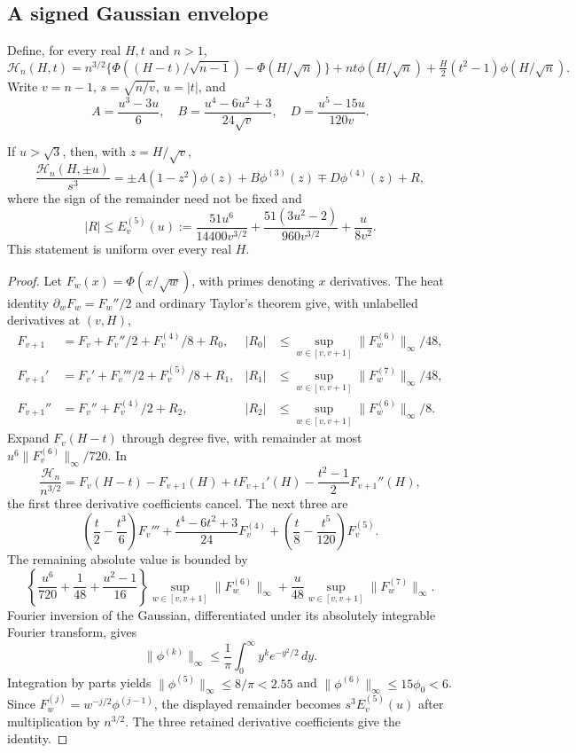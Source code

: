 \subsection{A signed Gaussian envelope}
Define, for every real $H,t$ and $n>1$,
\[
 \mathcal H_n(H,t)=n^{3/2}\{\Phi((H-t)/\sqrt{n-1})-
             \Phi(H/\sqrt n)\}
       +nt\phi(H/\sqrt n)+\tfrac H2(t^2-1)\phi(H/\sqrt n).
\]
Write $v=n-1$, $s=\sqrt{n/v}$, $u=|t|$, and
\[
 A=\frac{u^3-3u}{6},\quad B=\frac{u^4-6u^2+3}{24\sqrt v},
 \quad D=\frac{u^5-15u}{120v}.
\]
\begin{lemma}
If $u>\sqrt3$, then, with $z=H/\sqrt v$,
\[
 \frac{\mathcal H_n(H,\pm u)}{s^3}
 =\pm A(1-z^2)\phi(z)+B\phi^{(3)}(z)
                  \mp D\phi^{(4)}(z)+R,
\]
where the sign of the remainder need not be fixed and
\[
 |R|\le E^{(5)}_v(u):=
 \frac{51u^6}{14400v^{3/2}}
 +\frac{51(3u^2-2)}{960v^{3/2}}+\frac{u}{8v^2}.
\]
This statement is uniform over every real $H$.
\end{lemma}
\begin{proof}
Let $F_w(x)=\Phi(x/\sqrt w)$, with primes denoting $x$ derivatives.
The heat identity $\partial_w F_w=F_w''/2$ and ordinary Taylor's theorem
give, with unlabelled derivatives at $(v,H)$,
\begin{align*}
 F_{v+1}&=F_v+F_v''/2+F_v^{(4)}/8+R_0,
 &|R_0|&\le\sup_{w\in[v,v+1]}\|F_w^{(6)}\|_\infty/48,\\
 F_{v+1}'&=F_v'+F_v'''/2+F_v^{(5)}/8+R_1,
 &|R_1|&\le\sup_{w\in[v,v+1]}\|F_w^{(7)}\|_\infty/48,\\
 F_{v+1}''&=F_v''+F_v^{(4)}/2+R_2,
 &|R_2|&\le\sup_{w\in[v,v+1]}\|F_w^{(6)}\|_\infty/8.
\end{align*}
Expand $F_v(H-t)$ through degree five, with remainder at most
$u^6\|F_v^{(6)}\|_\infty/720$. In
\[
 \frac{\mathcal H_n}{n^{3/2}}=
 F_v(H-t)-F_{v+1}(H)+tF_{v+1}'(H)
             -\frac{t^2-1}{2}F_{v+1}''(H),
\]
the first three derivative coefficients cancel. The next three are
\[
 \left(\frac t2-\frac{t^3}6\right)F_v'''
 +\frac{t^4-6t^2+3}{24}F_v^{(4)}
 +\left(\frac t8-\frac{t^5}{120}\right)F_v^{(5)}.
\]
The remaining absolute value is bounded by
\[
 \left\{\frac{u^6}{720}+\frac1{48}+\frac{u^2-1}{16}\right\}
       \sup_{w\in[v,v+1]}\|F_w^{(6)}\|_\infty
 +\frac u{48}\sup_{w\in[v,v+1]}\|F_w^{(7)}\|_\infty.
\]
Fourier inversion of the Gaussian, differentiated under its absolutely
integrable Fourier transform, gives
\[
 \|\phi^{(k)}\|_\infty
 \le\frac1\pi\int_0^\infty y^k e^{-y^2/2}\,dy.
\]
Integration by parts yields
$\|\phi^{(5)}\|_\infty\le8/\pi<2.55$ and
$\|\phi^{(6)}\|_\infty\le15\phi_0<6$.
Since $F_w^{(j)}=w^{-j/2}\phi^{(j-1)}$, the displayed remainder
becomes $s^3E^{(5)}_v(u)$ after multiplication by $n^{3/2}$.
The three retained derivative coefficients give the identity.
\end{proof}

